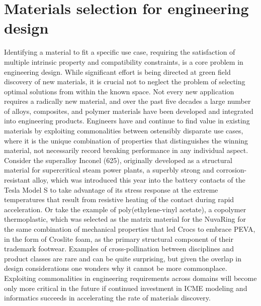 
\section{Materials selection for engineering design}

Identifying a material to fit a specific use case, requiring the satisfaction of multiple intrinsic property and compatibility constraints, is a core problem in engineering design. 
While significant effort is being directed at green field discovery of new materials, it is crucial not to neglect the problem of selecting optimal solutions from within the known space. 
Not every new application requires a radically new material, and over the past five decades a large number of alloys, composites, and polymer materials have been developed and integrated into engineering products. 
Engineers have and continue to find value in existing materials by exploiting commonalities between ostensibly disparate use cases, where it is the unique combination of properties that distinguishes the winning material, not necessarily record breaking performance in any individual aspect.
Consider the superalloy Inconel (625), originally developed as a structural material for supercritical steam power plants\cite{Eiselstein1991}, a superbly strong and corrosion-resistant alloy, which was introduced this year into the battery contacts of the Tesla\textsuperscript{\textregistered} Model S to take advantage of its stress response at the extreme temperatures that result from resistive heating of the contact during rapid acceleration\cite{Musk2015}.
Or take the example of poly(ethylene-vinyl acetate), a copolymer thermoplastic, which was selected as the matrix material for the NuvaRing\cite{Sarkar2005} for the same combination of mechanical properties that led Crocs\textsuperscript{\texttrademark} to embrace PEVA, in the form of Croslite foam, as the primary structural component of their trademark footwear. 
Examples of cross-pollination between disciplines and product classes are rare and can be quite surprising, but given the overlap in design considerations one wonders why it cannot be more commonplace. 
Exploiting commonalities in engineering requirements across domains will become only more critical in the future if continued investment in ICME modeling and informatics succeeds in accelerating the rate of materials discovery. 

